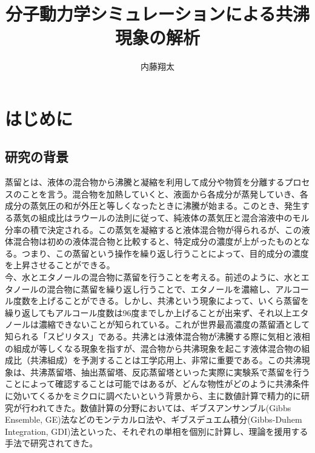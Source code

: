 \documentclass[titlepage]{jsreport}
\title{分子動力学シミュレーションによる共沸現象の解析}
\author{内藤翔太}
\begin{document}
\maketitle
{}

\tableofcontents
\pagestyle{plain}
\setcounter{page}{1}

\chapter{はじめに} \label{chap:introduction}


\section{研究の背景} \label{introduction:background}
蒸留\cite{distillation-book}とは、液体の混合物から沸騰と凝縮を利用して成分や物質を分離するプロセスのことを言う。混合物を加熱していくと、液面から各成分が蒸発していき、各成分の蒸気圧の和が外圧と等しくなったときに沸騰が始まる。このとき、発生する蒸気の組成比はラウールの法則\cite{raoul}に従って、純液体の蒸気圧と混合溶液中のモル分率の積で決定される。この蒸気を凝縮すると液体混合物が得られるが、この液体混合物は初めの液体混合物と比較すると、特定成分の濃度が上がったものとなる。つまり、この蒸留という操作を繰り返し行うことによって、目的成分の濃度を上昇させることができる。\\
今、水とエタノールの混合物に蒸留を行うことを考える。前述のように、水とエタノールの混合物に蒸留を繰り返し行うことで、エタノールを濃縮し、アルコール度数を上げることができる。しかし、共沸という現象によって、いくら蒸留を繰り返してもアルコール度数は96度までしか上げることが出来ず、それ以上エタノールは濃縮できないことが知られている。これが世界最高濃度の蒸留酒として知られる「スピリタス」\cite{spirytus}である。共沸とは液体混合物が沸騰する際に気相と液相の組成が等しくなる現象を指す\cite{azeotrope}が、混合物から共沸現象を起こす液体混合物の組成比（共沸組成）を予測することは工学応用上、非常に重要である。この共沸現象は、共沸蒸留塔\cite{azeotropic-distillation-1,azeotropic-distillation-2}、抽出蒸留塔\cite{extractive-distillation-1,extractive-distillation-2}、反応蒸留塔\cite{reactive-distillation-1,reactive-distillation-2}といった実際に実験系で蒸留を行うことによって確認することは可能ではあるが、どんな物性がどのように共沸条件に効いてくるかをミクロに調べたいという背景から、主に数値計算で精力的に研究が行われてきた。数値計算の分野においては、ギブスアンサンブル(Gibbs Ensemble, GE)法\cite{gibbs-ensemble-1,gibbs-ensemble-2}などのモンテカルロ法や、ギブスデュエム積分(Gibbs-Duhem Integration, GDI)法\cite{gibbs-duhem-integration-1,gibbs-duhem-integration-2}といった、それぞれの単相を個別に計算し、理論を援用する手法で研究されてきた。
\end{document}
